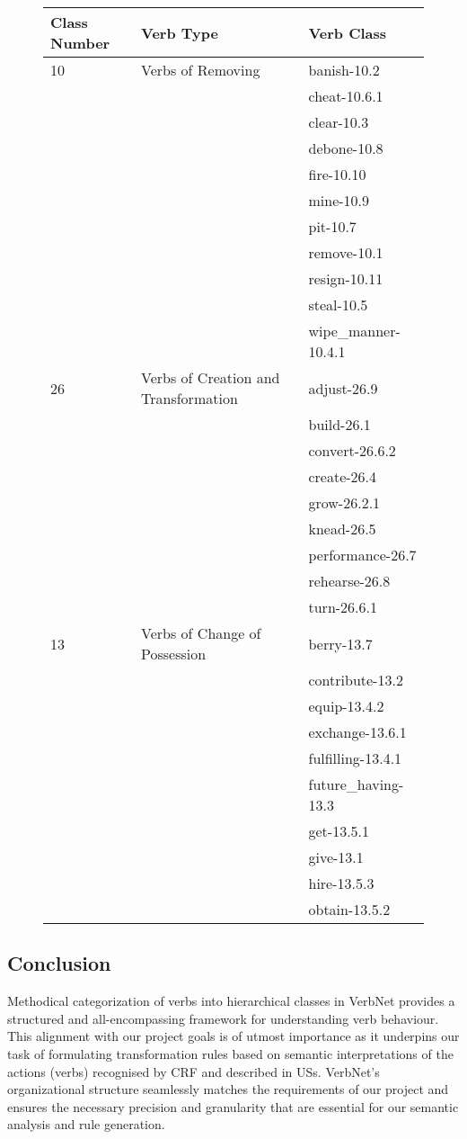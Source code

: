 \begin{figure}
\begingroup
\footnotesize
\centering
\begin{tabularx}{12cm}{l  l  l}
\hline
Class Number	&Verb Type	&Verb Class \\
\hline 
\hline
10&	Verbs of Removing		&banish-10.2 \\
&&cheat-10.6.1\\
&&clear-10.3\\
&&debone-10.8\\
&&fire-10.10\\
&&mine-10.9\\
&&pit-10.7\\
&&remove-10.1\\
&&resign-10.11\\
&&steal-10.5\\
&&wipe\_manner-10.4.1\\
\hline
26	&Verbs of Creation and Transformation	&adjust-26.9 \\
&&build-26.1 \\
&&convert-26.6.2\\
&&create-26.4\\
&&grow-26.2.1\\
&&knead-26.5\\
&&performance-26.7\\
&&rehearse-26.8\\
&&turn-26.6.1\\
\hline
13&	Verbs of Change of Possession	&berry-13.7 \\
&&contribute-13.2\\
&&equip-13.4.2\\
&&exchange-13.6.1\\
&&fulfilling-13.4.1\\
&&future\_having-13.3\\
&&get-13.5.1\\
&&give-13.1\\
&&hire-13.5.3\\
&&obtain-13.5.2\\
\hline
\end{tabularx}

\label{tb:vtype_example}

\endgroup
\end{figure}
\subsection*{Conclusion}\label{nlp_bottom_line}
Methodical categorization of verbs into hierarchical classes in VerbNet provides a structured and all-encompassing framework for understanding verb behaviour. This alignment with our project goals is of utmost importance as it underpins our task of formulating transformation rules based on semantic interpretations of the actions (verbs) recognised by CRF and described in USs. VerbNet's organizational structure seamlessly matches the requirements of our project and ensures the necessary precision and granularity that are essential for our semantic analysis and rule generation.
